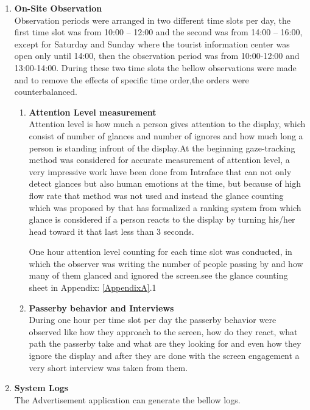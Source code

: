 \begin{enumerate}
\item \textbf{On-Site Observation} \\
Observation periods were arranged in two different time slots per day, the first time slot was from 10:00 – 12:00 and the second was from 14:00 – 16:00, except for Saturday and Sunday where the tourist information center was open only until 14:00, then the observation period was from 10:00-12:00 and 13:00-14:00. During these two time slots the bellow observations were made and to remove the effects of specific time order,the orders were counterbalanced.

\begin{enumerate}
\item \textbf{Attention Level measurement} \\
Attention level is how much a person gives attention to the display, which consist of number of glances and number of ignores and how much long a person is standing infront of the display.At the beginning gaze-tracking method was considered for accurate measurement of attention level, a very impressive work have been done from Intraface \cite{Intraface} that can not only detect glances but also human emotions at the time, but because of high flow rate that method was not used and instead the glance counting which was proposed by \cite{glancingcount} that has formalized a ranking system from which  glance is considered if a person reacts to the display by turning his/her head toward it that last less than 3 seconds.

One hour attention level counting for each time slot was conducted, in which the observer was writing the number of people passing by and how many of them glanced and ignored the screen.see the glance counting sheet in Appendix: \ref{AppendixA}.1

\item \textbf{Passerby behavior and Interviews} \\
During one hour per time slot per day the passerby behavior were observed like how they approach to the screen, how do they react, what path the passerby take and what are they looking for and even how they ignore the display and after they are done with the screen engagement a very short interview was taken from them. 

\end{enumerate}


\item \textbf{System Logs} \\
The Advertisement application can generate the bellow logs.
\begin{enumerate}


\end{enumerate}
\end{enumerate}
